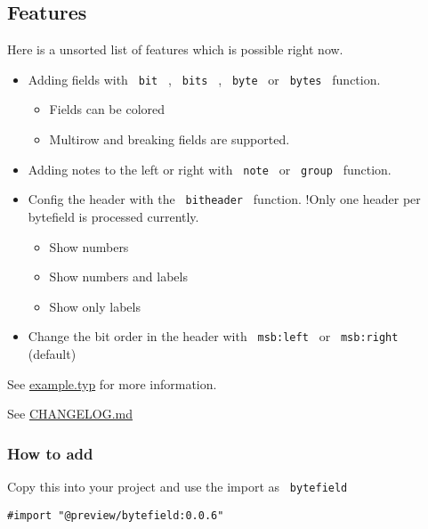 \subsection{Features}\label{features}

Here is a unsorted list of features which is possible right now.

\begin{itemize}
\tightlist
\item
  Adding fields with \texttt{\ bit\ } , \texttt{\ bits\ } ,
  \texttt{\ byte\ } or \texttt{\ bytes\ } function.

  \begin{itemize}
  \tightlist
  \item
    Fields can be colored
  \item
    Multirow and breaking fields are supported.
  \end{itemize}
\item
  Adding notes to the left or right with \texttt{\ note\ } or
  \texttt{\ group\ } function.
\item
  Config the header with the \texttt{\ bitheader\ } function. !Only one
  header per bytefield is processed currently.

  \begin{itemize}
  \tightlist
  \item
    Show numbers
  \item
    Show numbers and labels
  \item
    Show only labels
  \end{itemize}
\item
  Change the bit order in the header with \texttt{\ msb:left\ } or
  \texttt{\ msb:right\ } (default)
\end{itemize}

See
\href{https://github.com/typst/packages/raw/main/packages/preview/bytefield/0.0.6/example.typ}{example.typ}
for more information.

See
\href{https://github.com/typst/packages/raw/main/packages/preview/bytefield/0.0.6/CHANGELOG.md}{CHANGELOG.md}

\subsubsection{How to add}\label{how-to-add}

Copy this into your project and use the import as \texttt{\ bytefield\ }

\begin{verbatim}
#import "@preview/bytefield:0.0.6"
\end{verbatim}

